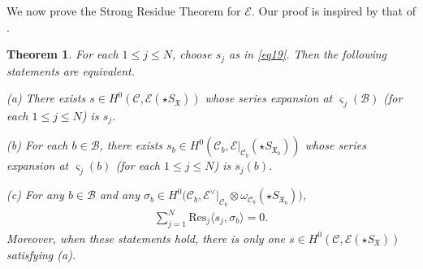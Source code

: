\documentclass[12pt,a4paper,notitlepage]{article}
\theoremstyle{definition}
\theoremstyle{plain}
\newtheorem{thm}[df]{Theorem}
\newcommand{\fk}{\mathfrak}
\newcommand{\mc}{\mathcal}
\newcommand{\Res}{\mathrm{Res}}
\newcommand{\bk}[1]{\langle {#1}\rangle}
\newcommand{\scr}{\mathscr}
\newcommand{\sgm}{\varsigma}
\newcommand{\SX}{{S_{\fk X}}}
\newcommand{\SXb}{{S_{\fk X_b}}}
\numberwithin{equation}{section}
\begin{document}
We now prove the Strong Residue Theorem for $\scr E$. Our proof is inspired by that of \cite[Thm. 1.22]{Ueno08}.

\begin{thm}\label{lb7}
For each $1\leq j\leq N$, choose $s_j$ as in \eqref{eq19}.  Then the following statements are equivalent.
	
(a) There exists $s\in H^0(\mc C,\scr E(\star\SX))$ whose series expansion at $\sgm_j(\mc B)$ (for each $1\leq j\leq N$) is $s_j$.

(b) For each $b\in\mc B$, there exists $s_b\in H^0(\mc C_b,\scr E|_{\mc C_b}(\star\SXb))$ whose series expansion at $\sgm_j(b)$ (for each $1\leq j\leq N$) is $s_j(b)$.
	
(c) For any $b\in\mc B$ and any $\sigma_b\in H^0\big(\mc C_b,\scr E^\vee|_{\mc C_b}\otimes\omega_{\mc C_b}(\star S_{\fk X_b})\big)$,
	\begin{align}
		\sum_{j=1}^N\Res_j\bk{s_j,\sigma_b}=0.
	\end{align}
	Moreover, when these statements hold, there is only one $s\in H^0(\mc C,\scr E(\star\SX))$ satisfying (a).
\end{thm}
\end{document}
